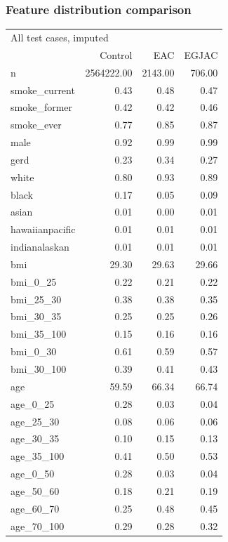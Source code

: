 \documentclass[12pt]{article}
\begin{document}
\subsubsection*{Feature distribution comparison}



\begin{minipage}{0.50\linewidth}\scriptsize
\begin{tabular}{lrrr}
  \toprule
  \multicolumn{4}{l}{All test cases, imputed} \\
 & Control & EAC & EGJAC \\ 
  \midrule
n & 2564222.00 & 2143.00 & 706.00 \\ 
  smoke\_current & 0.43 & 0.48 & 0.47 \\ 
  smoke\_former & 0.42 & 0.42 & 0.46 \\ 
  smoke\_ever & 0.77 & 0.85 & 0.87 \\ 
  male & 0.92 & 0.99 & 0.99 \\ 
  gerd & 0.23 & 0.34 & 0.27 \\ 
  white & 0.80 & 0.93 & 0.89 \\ 
  black & 0.17 & 0.05 & 0.09 \\ 
  asian & 0.01 & 0.00 & 0.01 \\ 
  hawaiianpacific & 0.01 & 0.01 & 0.01 \\ 
  indianalaskan & 0.01 & 0.01 & 0.01 \\ 
  bmi & 29.30 & 29.63 & 29.66 \\ 
  bmi\_0\_25 & 0.22 & 0.21 & 0.22 \\ 
  bmi\_25\_30 & 0.38 & 0.38 & 0.35 \\ 
  bmi\_30\_35 & 0.25 & 0.25 & 0.26 \\ 
  bmi\_35\_100 & 0.15 & 0.16 & 0.16 \\ 
  bmi\_0\_30 & 0.61 & 0.59 & 0.57 \\ 
  bmi\_30\_100 & 0.39 & 0.41 & 0.43 \\ 
  age & 59.59 & 66.34 & 66.74 \\ 
  age\_0\_25 & 0.28 & 0.03 & 0.04 \\ 
  age\_25\_30 & 0.08 & 0.06 & 0.06 \\ 
  age\_30\_35 & 0.10 & 0.15 & 0.13 \\ 
  age\_35\_100 & 0.41 & 0.50 & 0.53 \\ 
  age\_0\_50 & 0.28 & 0.03 & 0.04 \\ 
  age\_50\_60 & 0.18 & 0.21 & 0.19 \\ 
  age\_60\_70 & 0.25 & 0.48 & 0.45 \\ 
  age\_70\_100 & 0.29 & 0.28 & 0.32 \\ 
   \bottomrule
\end{tabular}
\end{minipage} \hfill
\end{document}
